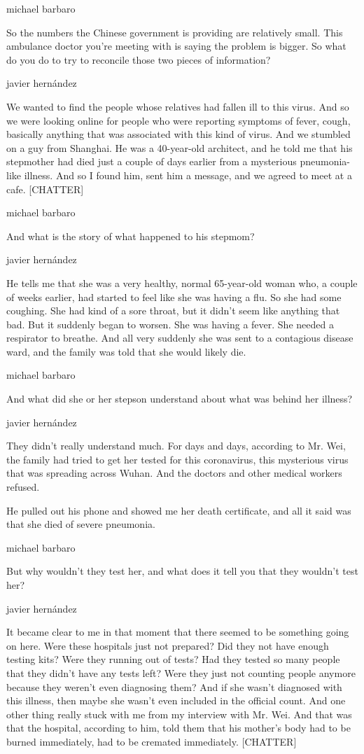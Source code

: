 michael barbaro

So the numbers the Chinese government is providing are relatively small.
This ambulance doctor you're meeting with is saying the problem is
bigger. So what do you do to try to reconcile those two pieces of
information?

javier hernández

We wanted to find the people whose relatives had fallen ill to this
virus. And so we were looking online for people who were reporting
symptoms of fever, cough, basically anything that was associated with
this kind of virus. And we stumbled on a guy from Shanghai. He was a
40-year-old architect, and he told me that his stepmother had died just
a couple of days earlier from a mysterious pneumonia-like illness. And
so I found him, sent him a message, and we agreed to meet at a cafe.
{[}CHATTER{]}

michael barbaro

And what is the story of what happened to his stepmom?

javier hernández

He tells me that she was a very healthy, normal 65-year-old woman who, a
couple of weeks earlier, had started to feel like she was having a flu.
So she had some coughing. She had kind of a sore throat, but it didn't
seem like anything that bad. But it suddenly began to worsen. She was
having a fever. She needed a respirator to breathe. And all very
suddenly she was sent to a contagious disease ward, and the family was
told that she would likely die.

michael barbaro

And what did she or her stepson understand about what was behind her
illness?

javier hernández

They didn't really understand much. For days and days, according to Mr.
Wei, the family had tried to get her tested for this coronavirus, this
mysterious virus that was spreading across Wuhan. And the doctors and
other medical workers refused.

He pulled out his phone and showed me her death certificate, and all it
said was that she died of severe pneumonia.

michael barbaro

But why wouldn't they test her, and what does it tell you that they
wouldn't test her?

javier hernández

It became clear to me in that moment that there seemed to be something
going on here. Were these hospitals just not prepared? Did they not have
enough testing kits? Were they running out of tests? Had they tested so
many people that they didn't have any tests left? Were they just not
counting people anymore because they weren't even diagnosing them? And
if she wasn't diagnosed with this illness, then maybe she wasn't even
included in the official count. And one other thing really stuck with me
from my interview with Mr. Wei. And that was that the hospital,
according to him, told them that his mother's body had to be burned
immediately, had to be cremated immediately. {[}CHATTER{]}

